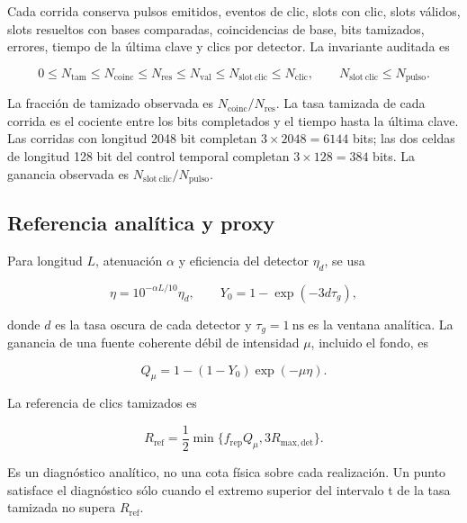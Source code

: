 \documentclass[12pt,a4paper]{article}
\begin{document}
Cada corrida conserva pulsos emitidos, eventos de clic, slots con clic, slots
válidos, slots resueltos con bases comparadas, coincidencias de base, bits
tamizados, errores, tiempo de la última clave y clics por detector. La
invariante auditada es

\begin{equation}
  0\leq N_{\mathrm{tam}}
  \leq N_{\mathrm{coinc}}
  \leq N_{\mathrm{res}}
  \leq N_{\mathrm{val}}
  \leq N_{\mathrm{slot\ clic}}
  \leq N_{\mathrm{clic}},
  \qquad
  N_{\mathrm{slot\ clic}}\leq N_{\mathrm{pulso}}.
  \label{eq:accounting}
\end{equation}

La fracción de tamizado observada es
\(N_{\mathrm{coinc}}/N_{\mathrm{res}}\). La tasa tamizada de cada corrida es
el cociente entre los bits completados y el tiempo hasta la última clave. Las
corridas con longitud 2048 bit completan \(3\times2048=6144\) bits; las dos
celdas de longitud 128 bit del control temporal completan \(3\times128=384\)
bits. La ganancia observada es
\(N_{\mathrm{slot\ clic}}/N_{\mathrm{pulso}}\).

\subsection*{Referencia analítica y proxy}

Para longitud \(L\), atenuación \(\alpha\) y eficiencia del detector
\(\eta_d\), se usa

\begin{equation}
  \eta=10^{-\alpha L/10}\eta_d,
  \qquad
  Y_0=1-\exp(-3d\tau_g),
\end{equation}

donde \(d\) es la tasa oscura de cada detector y
\(\tau_g=\SI{1}{\nano\second}\) es la ventana analítica. La ganancia de una
fuente coherente débil de intensidad \(\mu\), incluido el fondo, es

\begin{equation}
  Q_\mu=1-(1-Y_0)\exp(-\mu\eta).
  \label{eq:wcs-gain}
\end{equation}

La referencia de clics tamizados es

\begin{equation}
  R_{\mathrm{ref}}
  =\frac{1}{2}\min\{f_{\mathrm{rep}}Q_\mu,3R_{\mathrm{max,det}}\}.
  \label{eq:reference}
\end{equation}

Es un diagnóstico analítico, no una cota física sobre cada realización. Un
punto satisface el diagnóstico sólo cuando el extremo superior del intervalo
t de la tasa tamizada no supera \(R_{\mathrm{ref}}\).
\end{document}
